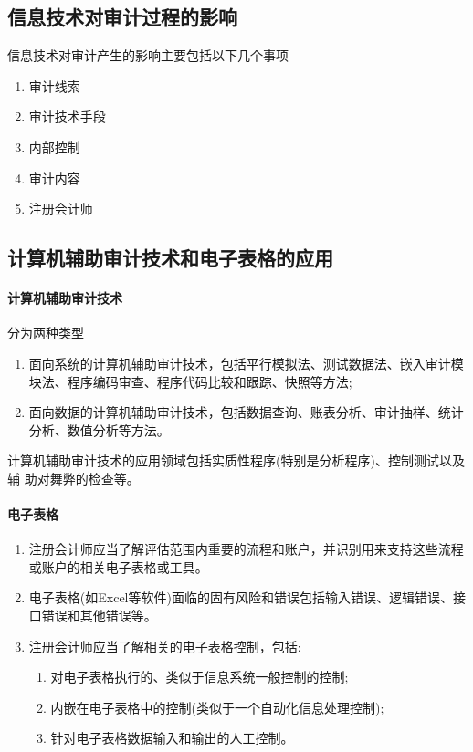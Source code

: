 \documentclass[UTF8,12pt]{ctexart}
\numberwithin{equation}{section} %
\numberwithin{figure}{section}
\numberwithin{table}{section}
\begin{document}
	\subsection{信息技术对审计过程的影响}
	信息技术对审计产生的影响主要包括以下几个事项
	\begin{enumerate}
		\item 审计线索
		
		\item 审计技术手段
		
		\item 内部控制
		
		\item 审计内容
		
		\item 注册会计师
	\end{enumerate}
	
	\subsection{计算机辅助审计技术和电子表格的应用}
	\paragraph{计算机辅助审计技术}
	分为两种类型
	\begin{enumerate}
		\item 面向系统的计算机辅助审计技术，包括平行模拟法、测试数据法、嵌入审计模块法、程序编码审查、程序代码比较和跟踪、快照等方法;
		
		\item 面向数据的计算机辅助审计技术，包括数据查询、账表分析、审计抽样、统计分析、数值分析等方法。
	\end{enumerate}
	
	计算机辅助审计技术的应用领域包括实质性程序(特别是分析程序)、控制测试以及辅 助对舞弊的检查等。
	
	\paragraph{电子表格}
	\begin{enumerate}
		\item 注册会计师应当了解评估范围内重要的流程和账户，并识别用来支持这些流程或账户的相关电子表格或工具。
		
		\item 电子表格(如Excel等软件)面临的固有风险和错误包括输入错误、逻辑错误、接口错误和其他错误等。
		
		\item 注册会计师应当了解相关的电子表格控制，包括: 
		\begin{enumerate}
			\item 对电子表格执行的、类似于信息系统一般控制的控制; 
			
			\item 内嵌在电子表格中的控制(类似于一个自动化信息处理控制); 
			
			\item 针对电子表格数据输入和输出的人工控制。
		\end{enumerate}
	\end{enumerate}
	
\end{document}
